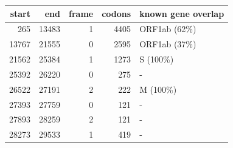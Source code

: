 \begin{tabular}{rrrrl}
\hline
start & end & frame & codons & known gene overlap \\
\hline
265 & 13483 & 1 & 4405 & ORF1ab (62\%) \\
13767 & 21555 & 0 & 2595 & ORF1ab (37\%) \\
21562 & 25384 & 1 & 1273 & S (100\%) \\
25392 & 26220 & 0 & 275 & - \\
26522 & 27191 & 2 & 222 & M (100\%) \\
27393 & 27759 & 0 & 121 & - \\
27893 & 28259 & 2 & 121 & - \\
28273 & 29533 & 1 & 419 & - \\
\hline
\end{tabular}